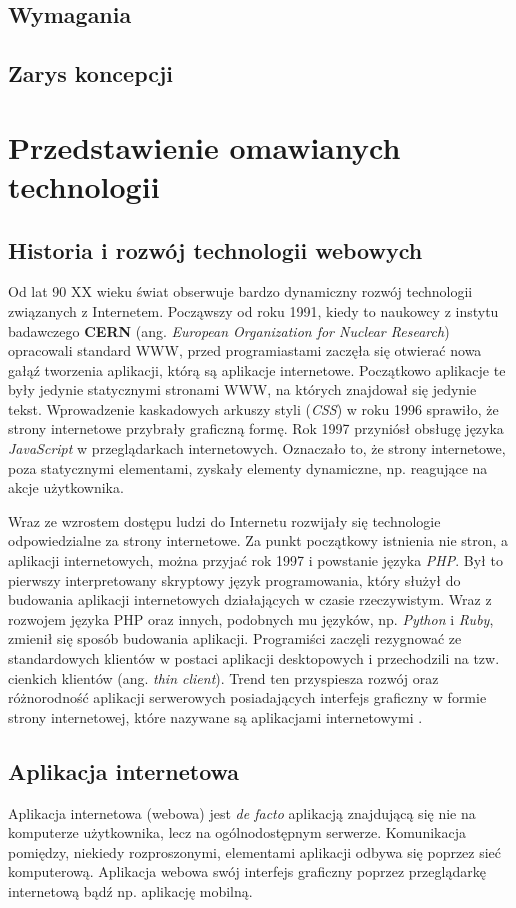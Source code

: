 \documentclass[mgr,oneside]{mgr}
\begin{document}
\section{Wymagania}
\section{Zarys koncepcji}

\chapter{Przedstawienie omawianych technologii}
\section{Historia i rozwój technologii webowych}
Od lat 90 XX wieku świat obserwuje bardzo dynamiczny rozwój technologii związanych z Internetem. Począwszy od roku 1991, kiedy to naukowcy z instytu badawczego \textbf{CERN} (ang. \textit{European Organization for Nuclear Research}) opracowali standard WWW, przed programiastami zaczęła się otwierać nowa gałąź tworzenia aplikacji, którą są aplikacje internetowe. Początkowo aplikacje te były jedynie statycznymi stronami WWW, na których znajdował się jedynie tekst. Wprowadzenie kaskadowych arkuszy styli (\emph{CSS}) w roku 1996 sprawiło, że strony internetowe przybrały graficzną formę. Rok 1997 przyniósł obsługę języka \emph{JavaScript} w przeglądarkach internetowych. Oznaczało to, że strony internetowe, poza statycznymi elementami, zyskały elementy dynamiczne, np. reagujące na akcje użytkownika.

Wraz ze wzrostem dostępu ludzi do Internetu rozwijały się technologie odpowiedzialne za strony internetowe. Za punkt początkowy istnienia nie stron, a aplikacji internetowych, można przyjać rok 1997 i powstanie języka \emph{PHP}. Był to pierwszy interpretowany skryptowy język programowania, który służył do budowania aplikacji internetowych działających w czasie rzeczywistym. Wraz z rozwojem języka PHP oraz innych, podobnych mu języków, np. \emph{Python} i \emph{Ruby}, zmienił się sposób budowania aplikacji. Programiści zaczęli rezygnować ze standardowych klientów w postaci aplikacji desktopowych i przechodzili na tzw. cienkich klientów (ang. \textit{thin client}). Trend ten przyspiesza rozwój oraz różnorodność aplikacji serwerowych posiadających interfejs graficzny w formie strony internetowej, które nazywane są aplikacjami internetowymi \cite{historia}.

\section{Aplikacja internetowa}
Aplikacja internetowa (webowa) jest \emph{de facto} aplikacją znajdującą się nie na komputerze użytkownika, lecz na ogólnodostępnym serwerze. Komunikacja pomiędzy, niekiedy rozproszonymi, elementami aplikacji odbywa się poprzez sieć komputerową. Aplikacja webowa swój interfejs graficzny poprzez przeglądarkę internetową bądź np. aplikację mobilną.
\end{document}
